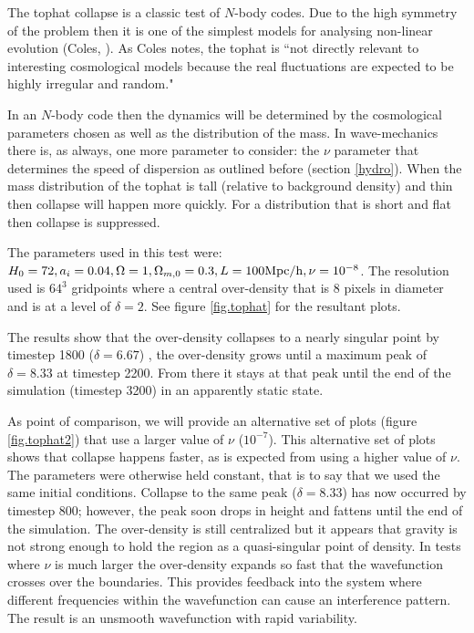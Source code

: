 The tophat collapse is a classic test of $N$-body codes. Due to the high symmetry of the problem then it is one of the simplest models for analysing non-linear evolution (Coles, \citep{bib_pcoles}). As Coles notes, the tophat is ``not directly relevant to interesting cosmological models because the real fluctuations are expected to be highly irregular and random."

In an $N$-body code then the dynamics will be determined by the cosmological parameters chosen as well as the distribution of the mass. In wave-mechanics there is, as always, one more parameter to consider: the $\nu$ parameter that determines the speed of dispersion as outlined before (section \ref{hydro}). When the mass distribution of the tophat is tall (relative to background density) and thin then collapse will happen more quickly. For a distribution that is short and flat then collapse is suppressed.

The parameters used in this test were: $H_0 = 72, a_i = 0.04, \Omega = 1, \Omega_{m,0} = 0.3, L = 100 {\rm Mpc/h}, \nu = 10^{-8}$. The resolution used is $64^3$ gridpoints where a central over-density that is 8 pixels in diameter and is at a level of $\delta = 2$. See figure \ref{fig.tophat} for the resultant plots.

The results show that the over-density collapses to a nearly singular point by timestep 1800 ($\delta = 6.67$) , the over-density grows until a maximum peak of $\delta = 8.33 $ at timestep 2200. From there it stays at that peak until the end of the simulation (timestep 3200) in an apparently static state.

As point of comparison, we will provide an alternative set of plots (figure \ref{fig.tophat2}) that use a larger value of $\nu$ ($10^{-7}$). This alternative set of plots shows that collapse happens faster, as is expected from using a higher value of $\nu$. The parameters were otherwise held constant, that is to say that we used the same initial conditions. Collapse to the same peak ($\delta = 8.33 $) has now occurred by timestep 800; however, the peak soon drops in height and fattens until the end of the simulation. The over-density is still centralized but it appears that gravity is not strong enough to hold the region as a quasi-singular point of density. In tests where $\nu$ is much larger the over-density expands so fast that the wavefunction crosses over the boundaries. This provides feedback into the system where different frequencies within the wavefunction can cause an interference pattern. The result is an unsmooth wavefunction with rapid variability.


